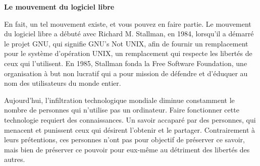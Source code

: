 \documentclass[twoside,12pt]{article}
\begin{document}
\begin{center}
{\Large\bf Le mouvement du logiciel libre}
\end{center}

En fait, un tel mouvement existe, et vous pouvez en faire partie. Le mouvement
du logiciel libre a débuté avec Richard M. Stallman, en 1984, lorsqu'il a
démarré le projet GNU, qui signifie \guillemotleft GNU's Not
UNIX\guillemotright, afin de fournir un remplacement pour le système
d'opération UNIX, un remplacement qui respecte les libertés de ceux qui
l'utilisent. En 1985, Stallman fonda la Free Software Foundation, une
organisation à but non lucratif qui a pour mission de défendre et d'éduquer au
nom des utilisateurs du monde entier.


Aujourd'hui, l'infiltration technologique mondiale diminue constamment le
nombre de personnes qui n'utilise pas un ordinateur. Faire fonctionner cette
technologie requiert des connaissances. Un savoir accaparé par des personnes,
qui menacent et punissent ceux qui désirent l'obtenir et le partager.
Contrairement à leurs prétentions, ces personnes n'ont pas pour objectif de
préserver ce savoir, mais bien de préserver ce pouvoir pour eux-même au
détriment des libertés des autres.

\end{document}
